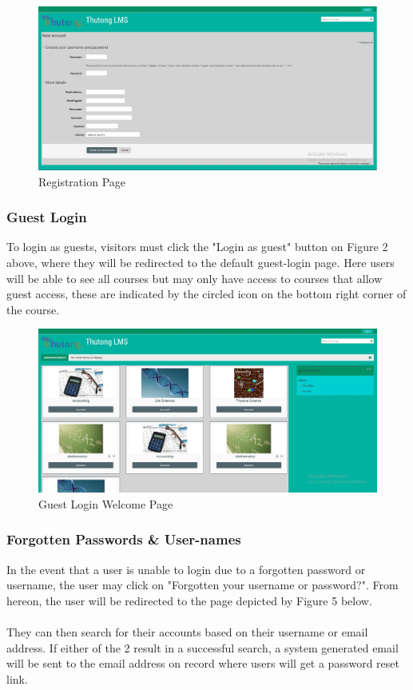 \documentclass[12pt,a4paper]{article}
\begin{document}
				\begin{figure}[h]
					\centering
					\includegraphics[width=1\textwidth]{images/registration.JPG}
					\caption{Registration Page}
					\label{Figure 3}
				\end{figure}
			
			\subsubsection{Guest Login}		
				To login as guests, visitors must click the "Login as guest" button on Figure 2 above, where they will be redirected to the default guest-login page. Here users will be able to see all courses but may only have access to courses that allow guest access, these are indicated by the circled icon on the bottom right corner of the course.
				
				\begin{figure}[h]
					\centering
					\includegraphics[width=1\textwidth]{images/guestLogin.JPG}
					\caption{Guest Login Welcome Page}
					\label{Figure 4}
				\end{figure}
			
			\subsubsection{Forgotten Passwords \& User-names}
				In the event that a user is unable to login due to a forgotten password or username, the user may click on "Forgotten your username or password?". From hereon, the user will be redirected to the page depicted by Figure 5 below.\\ \\They can then search for their accounts based on their username or email address. If either of the 2 result in a successful search, a system generated email will be sent to the email address on record where users will get a password reset link.\\
				
\end{document}
